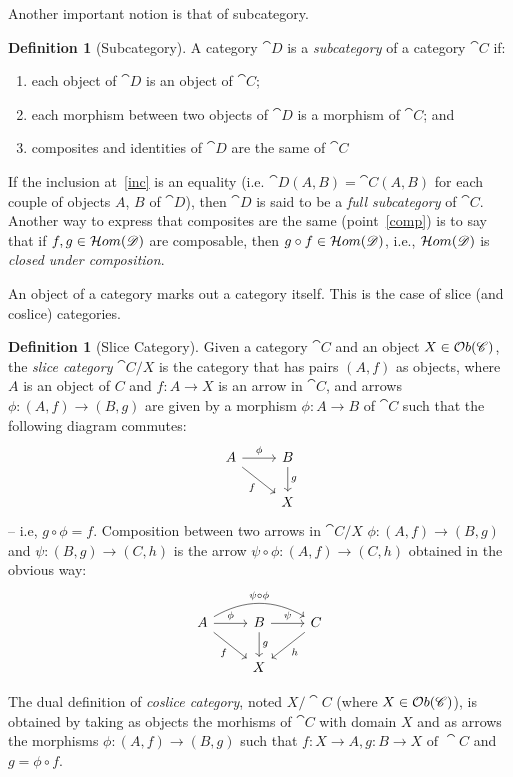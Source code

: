 \documentclass[a4paper, twoside,openright]{report}
\theoremstyle{plain}
\theoremstyle{definition}
\newtheorem{definition}[theorem]{Definition}
\begin{document}
Another important notion is that of subcategory.
\begin{definition}[Subcategory]
    A category $\cat{D}$ is a \emph{subcategory} of a category $\cat{C}$ if:
    \begin{enumerate}
        \item each object of $\cat{D}$ is an object of $\cat{C}$;
        \item \label{inc} each morphism between two objects of $\cat{D}$ is a morphism of $\cat{C}$; and
        \item \label{comp} composites and identities of $\cat{D}$ are the same of $\cat{C}$
    \end{enumerate}

    If the inclusion at~\ref{inc} is an equality (i.e. $\cat{D}(A, B) = \cat{C}(A, B)$ for each couple of objects $A$, $B$ of $\cat{D}$), then $\cat{D}$ is said to be a \emph{full subcategory} of $\cat{C}$.
    Another way to express that composites are the same (point~\ref{comp}) is to say that if $f, g \in \mathcal{H}om(\mathscr{D})$ are composable, then $g \circ f \in \mathcal{H}om(\mathscr{D})$, i.e., $\mathcal{H}om(\mathscr{D})$ is \emph{closed under composition}.
\end{definition}

An object of a category marks out a category itself. This is the case of slice (and coslice) categories.

\begin{definition}[Slice Category]\label{def:slice_cat}
    Given a category $\cat{C}$ and an object $X \in \mathcal{O}b(\mathscr{C})$, the \emph{slice category} $\cat{C}/X$ is the category that has pairs $(A, f)$ as objects, where $A$ is an object of $C$ and $f: A \rightarrow X$ is an arrow in $\cat{C}$, and arrows $\phi: (A, f) \rightarrow (B, g)$ are given by a morphism $\phi: A \rightarrow B$ of $\cat{C}$ such that the following diagram commutes:
    \[
        \begin{tikzcd}
            A \arrow[r, "{\phi}"] \arrow[dr, "f" swap] & B \arrow[d, "g"] \\
            & X
        \end{tikzcd}
    \]
    -- i.e, $g \circ \phi = f$.
    Composition between two arrows in $\cat{C}/X$ $\phi: (A, f) \rightarrow (B, g)$ and $\psi: (B, g) \rightarrow (C, h)$ is the arrow $\psi \circ \phi : (A, f) \rightarrow (C, h)$ obtained in the obvious way:
    \[
        \begin{tikzcd}
            A \arrow[bend left=30]{rr}{\psi \circ \phi}  \arrow[r, "{\phi}"] \arrow[dr, "f" swap] & B \arrow[r, "{\psi}"] \arrow[d, "g"] & C \arrow[dl, "h"] \\
            & X & 
        \end{tikzcd}
    \]

    The dual definition of \emph{coslice category}, noted $X/\cat{C}$ (where $X \in \mathcal{O}b(\mathscr{C})$), is obtained by taking as objects the morhisms of $\cat{C}$ with domain $X$ and as arrows the morphisms $\phi: (A, f) \rightarrow (B, g)$ such that $f:X\rightarrow A, g:B \rightarrow X \text{ of }\cat{C}$ and $g = \phi \circ f$. 
\end{definition}
\end{document}
